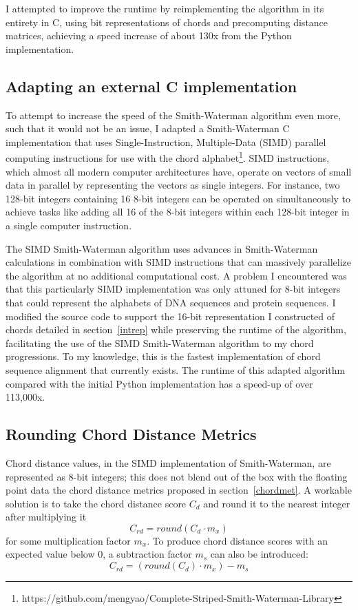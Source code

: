 I attempted to improve the runtime by reimplementing the algorithm in its entirety in C, using bit representations of chords and precomputing distance matrices, achieving a speed increase of about 130x from the Python implementation.

\subsection{Adapting an external C implementation}

To attempt to increase the speed of the Smith-Waterman algorithm even more, such that it would not be an issue, I adapted a Smith-Waterman C implementation that uses Single-Instruction, Multiple-Data (SIMD) parallel computing instructions for use with the chord alphabet\cite{Zhao_2013}\footnote{https://github.com/mengyao/Complete-Striped-Smith-Waterman-Library}. SIMD instructions, which almost all modern computer architectures have, operate on vectors of small data in parallel by representing the vectors as single integers. For instance, two 128-bit integers containing 16 8-bit integers can be operated on simultaneously to achieve tasks like adding all 16 of the 8-bit integers within each 128-bit integer in a single computer instruction.

The SIMD Smith-Waterman algorithm uses advances in Smith-Waterman calculations\cite{chao1992aligning} in combination with SIMD instructions that can massively parallelize the algorithm at no additional computational cost. A problem I encountered was that this particularly SIMD implementation was only attuned for 8-bit integers that could represent the alphabets of DNA sequences and protein sequences. I modified the source code to support the 16-bit representation I constructed of chords detailed in section~\ref{intrep} while preserving the runtime of the algorithm, facilitating the use of the SIMD Smith-Waterman algorithm to my chord progressions. To my knowledge, this is the fastest implementation of chord sequence alignment that currently exists. The runtime of this adapted algorithm compared with the initial Python implementation has a speed-up of over 113,000x.

\subsection{Rounding Chord Distance Metrics} \label{roundchord}

Chord distance values, in the SIMD implementation of Smith-Waterman, are represented as 8-bit integers; this does not blend out of the box with the floating point data the chord distance metrics proposed in section~\ref{chordmet}. A workable solution is to take the chord distance score $C_d$ and round it to the nearest integer after multiplying it \[ C_{rd} = round(C_d \cdot m_x) \] for some multiplication factor $m_x$. To produce chord distance scores with an expected value below $0$, a subtraction factor $m_s$ can also be introduced: \[ C_{rd} = (round(C_d) \cdot m_x) - m_s \]

